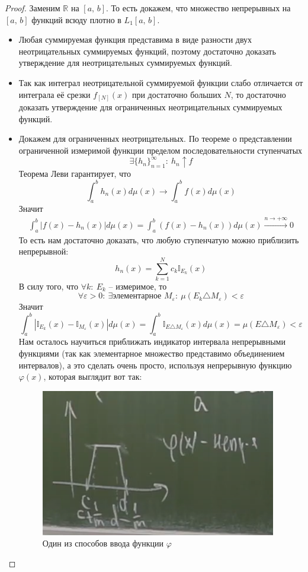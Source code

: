 \documentclass[a4paper,12pt]{article}
\renewcommand{\phi}{\ensuremath{\varphi}}
\theoremstyle{plain}
\theoremstyle{definition}
\theoremstyle{remark}
\begin{document}
\begin{proof}
	Заменим $\mathbb{R}$ на $[a,\,b]$. То есть докажем, что множество непрерывных на $[a,\,b]$ функций всюду плотно в $L_1[a,\,b]$.

	\begin{itemize}
		\item Любая суммируемая функция представима в виде разности двух неотрицательных суммируемых функций, поэтому достаточно доказать утверждение для
		      неотрицательных суммируемых функций.
		\item Так как интеграл неотрицательной суммируемой функции слабо отличается от интеграла её срезки $f_{[N]}(x)$ при достаточно больших $N$, то
		      достаточно доказать утверждение для ограниченных неотрицательных суммируемых функций.
		\item Докажем для ограниченных неотрицательных. По теореме о представлении ограниченной измеримой функции пределом последовательности ступенчатых
		      \[\exists \{h_n\}_{n = 1}^\infty:\: h_n \uparrow f\]
		      Теорема Леви гарантирует, что
		      \[\int_a^b h_n(x)d\mu(x) \to \int_a^b f(x)d\mu(x)\]
		      Значит
		      \begin{align*}
			      \int_a^b |f(x) - h_n(x)|d\mu(x) = \int_a^b (f(x) - h_n(x))d\mu(x) \stackrel{n \to +\infty}{\to} 0
		      \end{align*}
		      То есть нам достаточно доказать, что любую ступенчатую можно приблизить непрерывной:
		      \[h_n(x) = \sum_{k = 1}^N c_k \mathbb{I}_{E_k}(x)\]
		      В силу того, что $\forall k:\: E_k$ -- измеримое, то
		      \[\forall \varepsilon > 0:\: \exists \text{элементарное } M_\varepsilon:\: \mu(E_k \triangle M_\varepsilon) < \varepsilon \]
		      Значит
		      \[\int_a^b |\mathbb{I}_{E_k}(x) - \mathbb{I}_{M_\varepsilon}(x)|d\mu(x) = \int_a^b \mathbb{I}_{E \triangle M_\varepsilon}(x)d\mu(x) = \mu(E \triangle M_\varepsilon) < \varepsilon\]
		      Нам осталось научиться приближать индикатор интервала непрерывными функциями (так как элементарное множество представимо объединением интервалов), а это сделать очень просто, используя непрерывную функцию $\phi(x)$, которая выглядит вот так:
		      \begin{figure}[h]
			      \includegraphics[scale=0.5]{img/phi_graph.png}
			      \caption{Один из способов ввода функции $\phi$}
		      \end{figure}


\end{itemize}
\end{proof}
\end{document}
